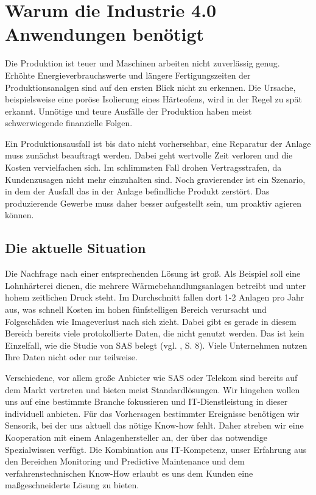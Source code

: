 \section{Warum die Industrie 4.0 Anwendungen benötigt}

Die Produktion ist teuer und Maschinen arbeiten nicht zuverlässig genug. Erhöhte Energieverbrauchswerte und längere Fertigungszeiten der Produktionsanalgen sind auf den ersten Blick nicht zu erkennen. Die Ursache, beispielsweise eine poröse Isolierung eines Härteofens, wird in der Regel zu spät erkannt. Unnötige und teure Ausfälle der Produktion haben meist schwerwiegende finanzielle Folgen.

Ein Produktionsausfall ist bis dato nicht vorhersehbar, eine Reparatur der Anlage muss zunächst beauftragt werden. Dabei geht wertvolle Zeit verloren und die Kosten vervielfachen sich. Im schlimmsten Fall drohen Vertragsstrafen, da Kundenzusagen nicht mehr einzuhalten sind. Noch gravierender ist ein Szenario, in dem der Ausfall das in der Anlage befindliche Produkt zerstört. Das produzierende Gewerbe muss daher besser aufgestellt sein, um proaktiv agieren können. 


\subsection{Die aktuelle Situation}
Die Nachfrage nach einer entsprechenden Lösung ist groß. Als Beispiel soll eine Lohnhärterei dienen, die mehrere Wärmebehandlungsanlagen betreibt und unter hohem zeitlichen Druck steht. Im Durchschnitt fallen dort 1-2 Anlagen pro Jahr aus, was schnell Kosten im hohen fünfstelligen Bereich verursacht und Folgeschäden wie Imageverlust nach sich zieht. Dabei gibt es gerade in diesem Bereich bereits viele protokollierte Daten, die nicht genutzt werden. Das ist kein Einzelfall, wie die Studie von SAS belegt (vgl. \cite{SasForsa}, S. 8). Viele Unternehmen nutzen Ihre Daten nicht oder nur teilweise.

Verschiedene, vor allem große Anbieter wie SAS oder Telekom sind bereits auf dem Markt vertreten und bieten meist Standardlösungen. Wir hingehen wollen uns auf eine bestimmte Branche fokussieren und IT-Dienstleistung in dieser individuell anbieten. Für das Vorhersagen bestimmter Ereignisse benötigen wir Sensorik, bei der uns aktuell das nötige Know-how fehlt. Daher streben wir eine Kooperation mit einem Anlagenhersteller an, der über das notwendige Spezialwissen verfügt. Die Kombination aus IT-Kompetenz, unser Erfahrung aus den Bereichen Monitoring und Predictive Maintenance und dem verfahrenstechnischen Know-How erlaubt es uns dem Kunden eine maßgeschneiderte Lösung zu bieten.

